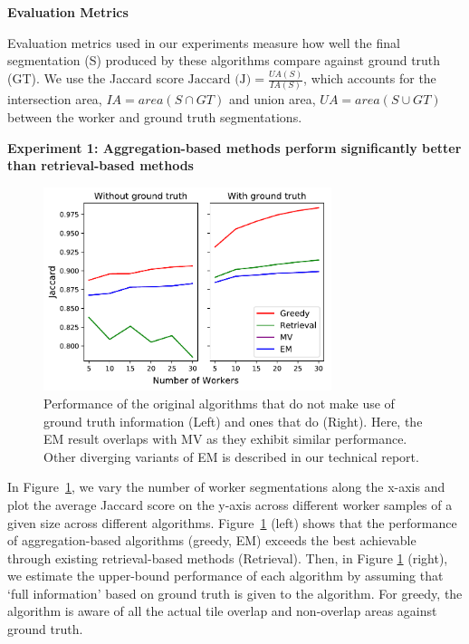 \documentclass[letterpaper]{article}
\newcommand{\agp}[1]{\textcolor{magenta}{Aditya: #1}}
\newcommand{\dor}[1]{\textcolor{blue}{Doris: #1}}
\newcommand{\npar}{\par \noindent}
\newcommand{\stitle}[1]{\noindent \textbf{#1}}
\begin{document}
\stitle{Evaluation Metrics}
\par \noindent Evaluation metrics used in our experiments measure how well the final segmentation (S) produced by these algorithms compare against ground truth (GT). We use the Jaccard score $\text{Jaccard (J)} = \frac{UA(S)}{IA(S)}$, which accounts for the intersection area, $IA=area(S\cap GT)$ and union area, $UA=area(S\cup GT)$ between the worker and ground truth segmentations.

\stitle{Experiment 1: Aggregation-based methods perform significantly better than retrieval-based methods}
\begin{figure}[h!]
   \centering
   \includegraphics[width=0.75\textwidth]{plots/Retrieval_vs_Aggregation.pdf}
   \caption{Performance of the original algorithms that do not make use of ground truth information (Left) and ones that do (Right). Here, the EM result overlaps with MV as they exhibit similar performance. Other diverging variants of EM is described in our technical report.} %
   \label{retrieval_vs_aggregation}   
\end{figure} 
\npar In Figure~\ref{retrieval_vs_aggregation}, we vary the number of worker segmentations along the x-axis and plot the average Jaccard score on the y-axis across different worker samples of a given size across different algorithms. Figure~\ref{retrieval_vs_aggregation} (left) shows that the performance of aggregation-based algorithms (greedy, EM) exceeds the best achievable through existing retrieval-based methods (Retrieval). Then, in Figure \ref{retrieval_vs_aggregation} (right), we estimate the upper-bound performance of each algorithm by assuming that `full information' based on ground truth is given to the algorithm. For greedy, the algorithm is aware of all the actual tile overlap and non-overlap areas against ground truth. %
\end{document}
